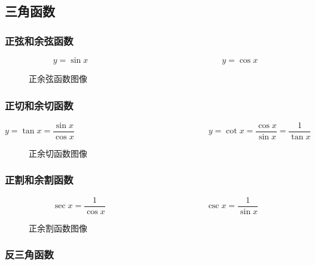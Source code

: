 \documentclass[12pt, a4paper, oneside, UTF8]{ctexbook}  %
\begin{document}
\subsection{三角函数}

\subsubsection{正弦和余弦函数}
$$
    \boxed{y=\sin x}
    \qquad \qquad \qquad \qquad \qquad \qquad \qquad \qquad
    \boxed{y=\cos x}
$$
\begin{figure}[H] \centering
    \caption{ 正余弦函数图像}
\end{figure}

\subsubsection{正切和余切函数}
$$
    \boxed{y=\tan x=\frac{\sin x}{\cos x}}
    \qquad \qquad \qquad \qquad \qquad \qquad \qquad \qquad
    \boxed{y=\cot x=\frac{\cos x}{\sin x}=\frac{1}{\tan x}}
$$
\begin{figure}[H] \centering
    \caption{正余切函数图像}
\end{figure}

\subsubsection{正割和余割函数}
$$
    \boxed{\sec x=\frac{1}{\cos x}}
    \qquad  \qquad \qquad \qquad \qquad \qquad
    \boxed{\csc x=\frac{1}{\sin x}}
$$
\begin{figure}[H] \centering
    \caption{正余割函数图像}
\end{figure}

\subsubsection{反三角函数}
\end{document}
